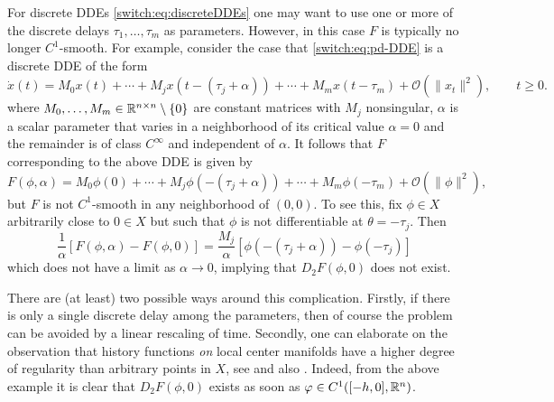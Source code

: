 \begin{remark}\label{switch:rem:nonsmooth}
  For discrete DDEs \cref{switch:eq:discreteDDEs} one may want to use one or more of the discrete delays $\tau_1,\ldots,\tau_m$ as parameters. However, in this case $F$ is typically no longer $C^1$-smooth. For example, consider the case that \cref{switch:eq:pd-DDE} is a discrete DDE of the form
  \[
    \dot{x}(t) = M_0x(t) + \cdots + M_j x(t - (\tau_j + \alpha)) + \cdots + M_m
    x(t - \tau_m) + \mathcal O(\|x_t\|^2), \qquad t \ge 0.
  \]
  where $M_0,\ldots,M_m \in \mathbb{R}^{n \times n} \setminus \{0\}$ are constant matrices with $M_j$ nonsingular, $\alpha$ is a scalar parameter that varies in a neighborhood of its critical value $\alpha = 0$ and the remainder is of class $C^{\infty}$ and independent of $\alpha$. It follows that $F$ corresponding to the above DDE is given by
  \[
    F(\phi,\alpha) = M_0 \phi(0) + \cdots + M_j\phi(-(\tau_j + \alpha)) + \cdots
    + M_m\phi(-\tau_m) + \mathcal O(\|\phi\|^2),
  \]
  but $F$ is not $C^1$-smooth in any neighborhood of $(0,0)$. To see this, fix $\phi \in X$ arbitrarily close to $0 \in X$ but such that $\phi$ is not differentiable at $\theta = -\tau_j$. Then
  \[
    \frac{1}{\alpha}\left[F(\phi,\alpha) - F(\phi,0)\right] = \frac{M_j}{\alpha}\left[\phi(-(\tau_j + \alpha)) - \phi(-\tau_j)\right]
  \]
  which does not have a limit as $\alpha \to 0$, implying that $D_2F(\phi,0)$ does not exist.

  There are (at least) two possible ways around this complication. Firstly, if there is only a single discrete delay among the parameters, then of course the problem can be avoided by a linear rescaling of time. Secondly, one can elaborate on the observation that history functions \emph{on} local center manifolds have a higher degree of regularity than arbitrary points in $X$, see \textup{\cite[Remark IX.9.2]{diekmann1995delay}} and also \cite{Hale1979}. Indeed, from the above example it is clear that $D_2F(\phi,0)$ exists as soon as $\varphi \in C^1([-h,0],\mathbb{R}^n)$.
\end{remark}

